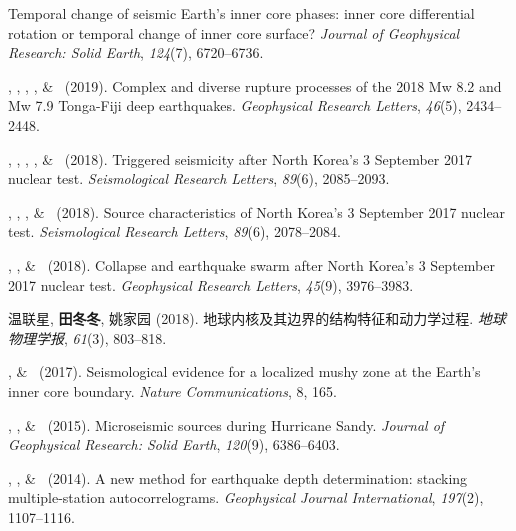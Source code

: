 \begin{etaremune}
    Temporal change of seismic Earth's inner core phases: inner core differential rotation or temporal change of inner core surface?
    \emph{Journal of Geophysical Research: Solid Earth}, \emph{124}(7), 6720--6736.
\item
    \WFan\CS, \SWei, \Me, \JMcGurie, \& \DWiens\ (2019).
    Complex and diverse rupture processes of the 2018 Mw 8.2 and Mw 7.9 Tonga-Fiji deep earthquakes.
    \emph{Geophysical Research Letters}, \emph{46}(5), 2434--2448.
\item
    \JYao\CF\CS, \Me\CF, \ZLu, \LSun, \& \LWen\ (2018).
    Triggered seismicity after North Korea's 3 September 2017 nuclear test.
    \emph{Seismological Research Letters}, \emph{89}(6), 2085--2093.
\item
    \JYao\CF\CS, \Me\CF, \LSun, \& \LWen\ (2018).
    Source characteristics of North Korea's 3 September 2017 nuclear test.
    \emph{Seismological Research Letters}, \emph{89}(6), 2078--2084.
\item
    \Me\CF\CS, \JYao\CF, \& \LWen\ (2018).
    Collapse and earthquake swarm after North Korea's 3 September 2017 nuclear test.
    \emph{Geophysical Research Letters}, \emph{45}(9), 3976--3983.
\item
    温联星\CS, \textbf{田冬冬}, 姚家园 (2018).
    地球内核及其边界的结构特征和动力学过程.
    \emph{地球物理学报}, \emph{61}(3), 803--818.
\item
    \Me, \& \LWen\CS\ (2017).
    Seismological evidence for a localized mushy zone at the Earth's inner core boundary.
    \emph{Nature Communications}, 8, 165.
\item
    \XChen\CS, \Me, \& \LWen\ (2015).
    Microseismic sources during Hurricane Sandy.
    \emph{Journal of Geophysical Research: Solid Earth}, \emph{120}(9), 6386--6403.
\item \MZhang\CS, \Me, \& \LWen\ (2014).
    A new method for earthquake depth determination: stacking multiple-station autocorrelograms.
    \emph{Geophysical Journal International}, \emph{197}(2), 1107--1116.
\end{etaremune}


